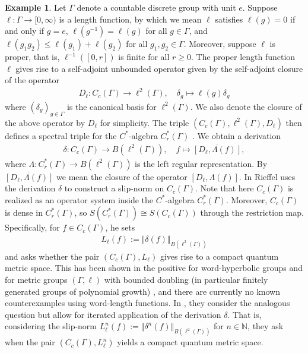 \documentclass[11pt,a4paper,oneside,final,reqno]{amsart}
\theoremstyle{definition}
\newtheorem{example}[lemma]{Example}
\newcommand{\Cred}{C_{r}^{*}}
\newcommand{\N}{\mathbb{N}}
\numberwithin{equation}{section}
\begin{document}
	
	\begin{example}\label{example:CQMS-from-groups}
		Let $\Gamma$ denote a countable discrete group with unit $e$. Suppose $\ell \colon \Gamma \to [0,\infty)$ is a length function, by which we mean $\ell$ satisfies $\ell(g) = 0$ if and only if $g = e$, $\ell(g^{-1}) = \ell(g)$ for all $g \in \Gamma$, and $\ell(g_1g_2) \leq \ell(g_1) + \ell(g_2)$ for all $g_1,g_2 \in \Gamma$. Moreover, suppose $\ell$ is proper, that is, $\ell^{-1}([0,r])$ is finite for all $r \geq 0$. 
		The proper length function $\ell$ gives rise to a self-adjoint unbounded operator given by the self-adjoint closure of the operator
		\begin{align*}
			D_\ell \colon C_c (\Gamma) \to \ell^2(\Gamma), \quad \delta_g \mapsto \ell(g) \delta_g 
		\end{align*}
		where $(\delta_g)_{g \in \Gamma}$ is the canonical basis for $\ell^2(\Gamma)$. We also denote the closure of the above operator by $D_\ell$ for simplicity. The triple $(C_c (\Gamma), \ell^2 (\Gamma), D_\ell)$ then defines a spectral triple for the $C^*$-algebra $\Cred (\Gamma)$ \cite{Connes1989}. We obtain a derivation
		\begin{align*}
			\delta \colon C_c (\Gamma) \to B(\ell^2(\Gamma)), \quad f \mapsto \overline{[D_\ell, \Lambda(f)]},
		\end{align*}
		where $\Lambda \colon \Cred(\Gamma) \to B(\ell^2(\Gamma))$ is the left regular representation. By $\overline{[D_\ell, \Lambda(f)]}$ we mean the closure of the operator $[D_\ell, \Lambda(f)]$.  In \cite{Rieffel02CQMS} Rieffel uses the derivation $\delta$ to construct a slip-norm on $C_c(\Gamma)$. Note that here $C_c (\Gamma)$ is realized as an operator system inside the $C^*$-algebra $\Cred (\Gamma)$. Moreover, $C_c(\Gamma)$ is dense in $\Cred(\Gamma)$, so $S(\Cred (\Gamma)) \cong S(C_c(\Gamma))$ through the restriction map. Specifically, for $f \in C_c(\Gamma)$, he sets 
		\begin{align}\label{eq:slip-norm-length-discrete-group-case}
			L_\ell (f) := \Vert \delta(f) \Vert_{B(\ell^2(\Gamma))}
		\end{align}
		and asks whether the pair $(C_c (\Gamma), L_\ell)$ gives rise to a compact quantum metric space. 
		This has been shown in the positive for word-hyperbolic groups \cite{OzawaRieffel2004} and for metric groups $(\Gamma, \ell)$ with bounded doubling (in particular finitely generated groups of polynomial growth) \cite{ChristRieffel}, and there are currently no known counterexamples using word-length functions. In \cite{ChristensenIvanRD}, they consider the analogous question but allow for iterated application of the derivation $\delta$. That is, considering the slip-norm $L^n_\ell(f) := \Vert \delta^n (f) \Vert_{B(\ell^2(\Gamma))}$ for $n \in \N$, they ask when the pair $(C_c (\Gamma), L^n_\ell)$ yields a compact quantum metric space. 

\end{example}
\end{document}
